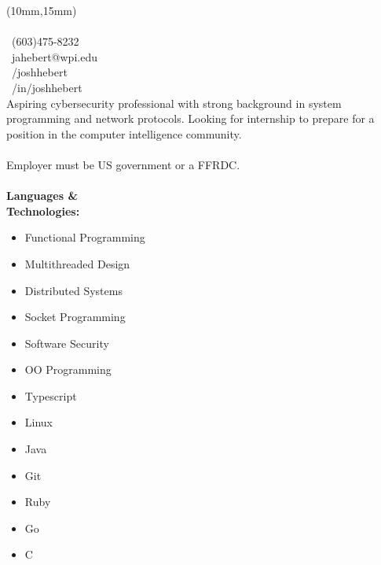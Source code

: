 \documentclass[11pt,oneside]{letter}
\begin{document}
\begin{textblock*}{35mm}(10mm,15mm)
\\\\
    \faPhone \, (603)475-8232\\ 
    \faEnvelope \, jahebert@wpi.edu \\
    \faGithub \, /joshhebert \\
    \faLinkedin \, /in/joshhebert \\
    
    
    Aspiring cybersecurity professional with strong background in system programming and network protocols. Looking for internship to prepare for a position in the computer intelligence community.\\\\
    Employer must be US government or a FFRDC.\\\\



    {\bf Languages \&\\Technologies:}
    \begin{itemize}[leftmargin=0in]
        \item[] Functional Programming
        \item[] Multithreaded Design
        \item[] Distributed Systems
        \item[] Socket Programming
        \item[] Software Security
        \item[] OO Programming
        \item[] Typescript
        \item[] Linux
        \item[] Java
        \item[] Git
        \item[] Ruby 
        \item[] Go
        \item[] C
    \end{itemize}
\end{textblock*}
\end{document}
